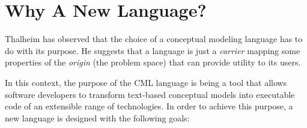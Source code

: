 \section{Why A New Language?}\label{sec:why}

Thalheim \cite{thalheim} has observed that
the choice of a conceptual modeling language has to do with its purpose.
He suggests that
a language is just a \emph{carrier} mapping some properties of the \emph{origin} (the problem space)
that can provide utility to its users.

In this context, the purpose of the CML language is being a tool
that allows software developers to transform text-based conceptual models
into executable code of an extensible range of technologies.
In order to achieve this purpose,
a new language is designed with the following goals:

